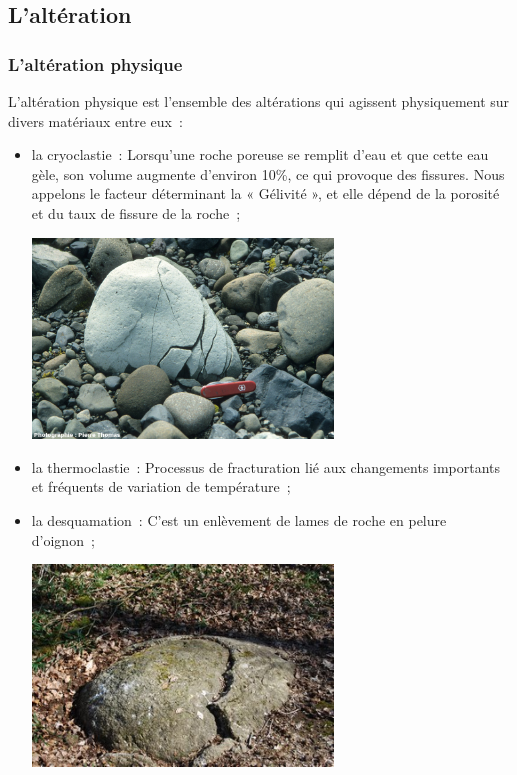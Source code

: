 \documentclass[a4paper,11pt]{article}
\begin{document}
\subsection{L'altération}
\subsubsection{L'altération physique}

L'altération physique est l'ensemble des altérations qui agissent physiquement sur divers matériaux entre eux~:
\begin{itemize}
  \item la cryoclastie~: Lorsqu'une roche poreuse se remplit d'eau et que cette eau gèle, son volume augmente d'environ 10\%, ce qui provoque des fissures.
  Nous appelons le facteur déterminant la « Gélivité », et elle dépend de la porosité et du taux de fissure de la roche~;

  \medbreak
  \begin{center}
    \includegraphics[width=8cm]{Images/Erosion/cryoclastie.jpg}
  \end{center}
  \medbreak

  \item la thermoclastie~: Processus de fracturation lié aux changements importants et fréquents de variation de température~;
  \item la desquamation~: C'est un enlèvement de lames de roche en pelure d'oignon~;

  \medbreak
  \begin{center}
    \includegraphics[width=8cm]{Images/Erosion/desquamation.jpg}
  \end{center}
  \medbreak
  

\end{itemize}
\end{document}
